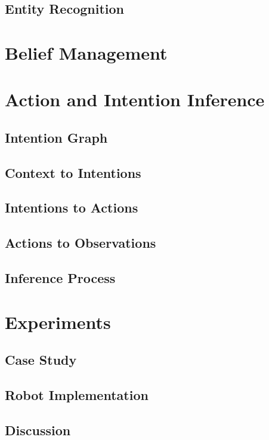 \subsection{Entity Recognition}


\section{Belief Management}
\label{situation_assessment-belief_management}

\section{Action and Intention Inference}
\label{situation_assessment-intention_recognition}

\subsection{Intention Graph}
\subsection{Context to Intentions}
\subsection{Intentions to Actions}
\subsection{Actions to Observations}
\subsection{Inference Process}

\section{Experiments}
\label{situation_assessment-experiments}
\subsection{Case Study}
\subsection{Robot Implementation}
\subsection{Discussion}

